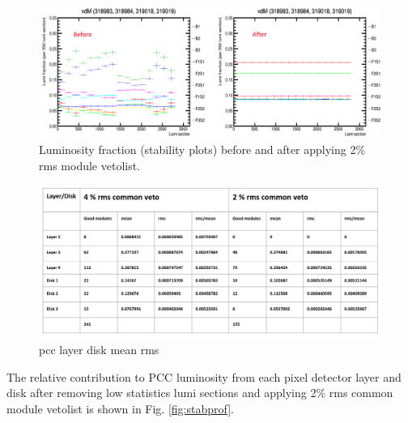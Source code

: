\begin{figure}[!htp]
\centering
\includegraphics[width=1\textwidth]{ashish_thesis/before_after_vdm_stability.png}
\caption{%
   Luminosity fraction (stability plots) before and after applying 2\% rms module vetolist.
}
\label{fig:b_a_stability_vdm}
\end{figure}





\begin{figure}[!htp]
\centering
\includegraphics[width=1\textwidth]{ashish_thesis/pcc_layer_disk_mean_rms.png}
\caption{%
pcc layer disk mean rms
}
\label{fig:pixellalyerdiskmeanrms}
\end{figure}








The relative contribution to PCC luminosity from each pixel detector layer and disk after removing low statistics lumi sections and applying 2\% rms common module vetolist is shown in Fig. \ref{fig:stabprof}.

